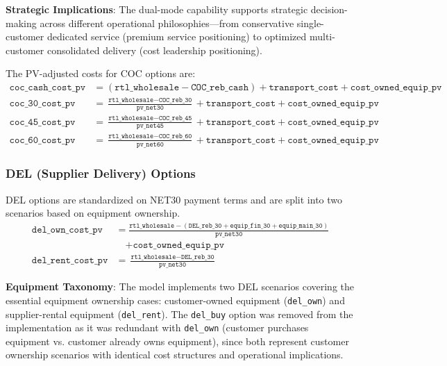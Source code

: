 \textbf{Strategic Implications}: The dual-mode capability supports strategic decision-making across different operational philosophies—from conservative single-customer dedicated service (premium service positioning) to optimized multi-customer consolidated delivery (cost leadership positioning).

The PV-adjusted costs for COC options are:
\begin{align}
    \texttt{coc\_cash\_cost\_pv} &= (\texttt{rtl\_wholesale} - \texttt{COC\_reb\_cash}) + \texttt{transport\_cost} + \texttt{cost\_owned\_equip\_pv} \\
    \texttt{coc\_30\_cost\_pv} &= \frac{\texttt{rtl\_wholesale} - \texttt{COC\_reb\_30}}{\texttt{pv\_net30}} + \texttt{transport\_cost} + \texttt{cost\_owned\_equip\_pv} \\
    \texttt{coc\_45\_cost\_pv} &= \frac{\texttt{rtl\_wholesale} - \texttt{COC\_reb\_45}}{\texttt{pv\_net45}} + \texttt{transport\_cost} + \texttt{cost\_owned\_equip\_pv} \\
    \texttt{coc\_60\_cost\_pv} &= \frac{\texttt{rtl\_wholesale} - \texttt{COC\_reb\_60}}{\texttt{pv\_net60}} + \texttt{transport\_cost} + \texttt{cost\_owned\_equip\_pv}
\end{align}

\subsubsection{DEL (Supplier Delivery) Options}
DEL options are standardized on NET30 payment terms and are split into two scenarios based on equipment ownership.
\begin{align}
    \texttt{del\_own\_cost\_pv} &= \frac{\texttt{rtl\_wholesale} - (\texttt{DEL\_reb\_30} + \texttt{equip\_fin\_30} + \texttt{equip\_main\_30})}{\texttt{pv\_net30}} \nonumber \\
    &\quad + \texttt{cost\_owned\_equip\_pv} \\
    \texttt{del\_rent\_cost\_pv} &= \frac{\texttt{rtl\_wholesale} - \texttt{DEL\_reb\_30}}{\texttt{pv\_net30}}
\end{align}

\textbf{Equipment Taxonomy}: The model implements two DEL scenarios covering the essential equipment ownership cases: customer-owned equipment (\texttt{del\_own}) and supplier-rental equipment (\texttt{del\_rent}). The \texttt{del\_buy} option was removed from the implementation as it was redundant with \texttt{del\_own} (customer purchases equipment vs. customer already owns equipment), since both represent customer ownership scenarios with identical cost structures and operational implications.

